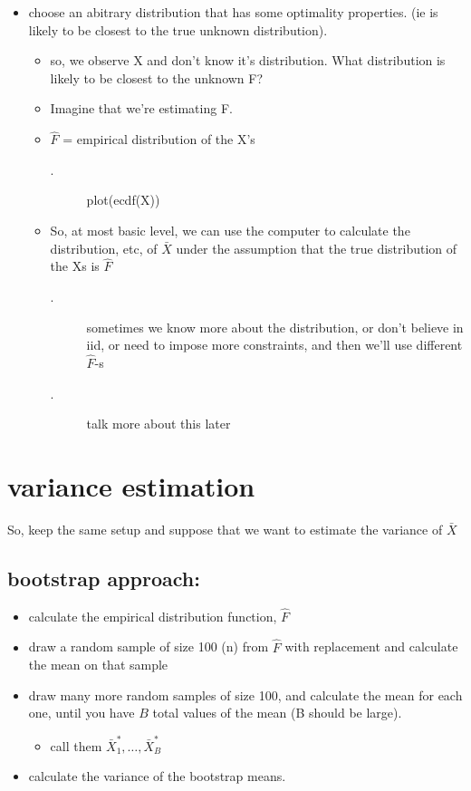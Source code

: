 \begin{itemize}
\begin{itemize}
\begin{itemize}
\begin{itemize}
\end{itemize}
\item choose an abitrary distribution that has some optimality
         properties. (ie is likely to be closest to the true unknown
         distribution).
\begin{itemize}
\item so, we observe X and don't know it's distribution.  What
           distribution is likely to be closest to the unknown F?
\item Imagine that we're estimating F.
\item $\hat F$ = empirical distribution of the X's
\begin{description}
\item[.] plot(ecdf(X))
\end{description}
\item So, at most basic level, we can use the computer to
           calculate the distribution, etc, of $\bar X$ under the
           assumption that the true distribution of the Xs is $\hat F$
\begin{description}
\item[.] sometimes we know more about the distribution, or don't
             believe in iid, or need to impose more constraints, and
             then we'll use different $\hat F$-s
\item[.] talk more about this later
\end{description}
\end{itemize}
\end{itemize}
\end{itemize}
\end{itemize}

\section{variance estimation}

    So, keep the same setup and suppose that we want to estimate the
    variance of $\bar X$

\subsection{bootstrap approach:}

\begin{itemize}
\item calculate the empirical distribution function, $\hat F$
\item draw a random sample of size 100 (n) from $\hat F$ with
         replacement and calculate the mean on that sample
\item draw many more random samples of size 100, and calculate the
         mean for each one, until you have $B$ total values of the mean
         (B should be large).
\begin{itemize}
\item call them $\bar X_1^*,\dots, \bar X_B^*$
\end{itemize}
\item calculate the variance of the bootstrap means.
\end{itemize}

